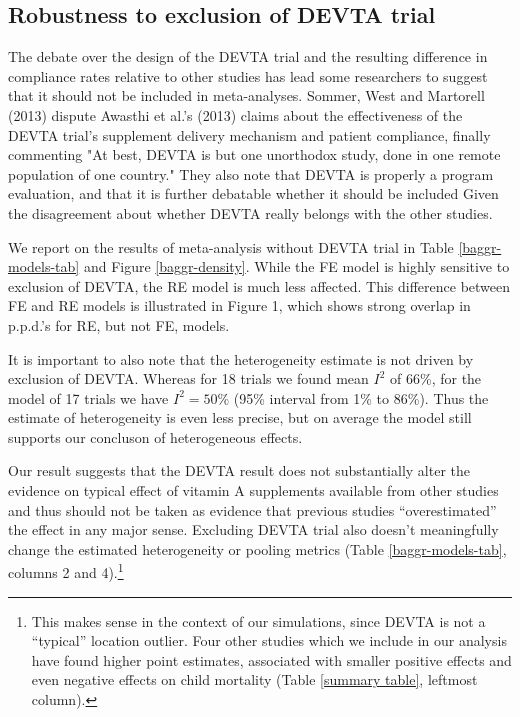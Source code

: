 \documentclass[12pt]{article}
\begin{document}
\subsection{Robustness to exclusion of DEVTA trial}

The debate over the design of the DEVTA trial and the resulting difference in compliance rates relative to other studies has lead some researchers to suggest that it should not be included in meta-analyses. Sommer, West and Martorell (2013) dispute Awasthi et al.'s (2013) claims about the effectiveness of the DEVTA trial's supplement delivery mechanism and patient compliance, finally commenting "At best, DEVTA is but one unorthodox study, done in one remote population of one country." 
They also note that DEVTA is properly a program evaluation, and that it is further debatable whether it should be included Given the disagreement about whether DEVTA really belongs with the other studies. 

We report on the results of meta-analysis without DEVTA trial in Table \ref{baggr-models-tab} and Figure \ref{baggr-density}. While the FE model is highly sensitive to exclusion of DEVTA, the RE model is much less affected. This difference between FE and RE models is illustrated in Figure 1, which shows strong overlap in p.p.d.'s for RE, but not FE, models.

It is important to also note that the heterogeneity estimate is not driven by exclusion of DEVTA. Whereas for 18 trials we found mean $I^2$ of 66\%, for the model of 17 trials we have $I^2 = 50\%$ (95\% interval from 1\% to 86\%). Thus the estimate of heterogeneity is even less precise, but on average the model still supports our concluson of heterogeneous effects.

Our result suggests that the DEVTA result does not substantially alter the evidence on typical effect of vitamin A supplements available from other studies and thus should not be taken as evidence that previous studies ``overestimated'' the effect in any major sense. Excluding DEVTA trial also doesn't meaningfully change the estimated heterogeneity or pooling metrics (Table \ref{baggr-models-tab}, columns 2 and 4).\footnote{This makes sense in the context of our simulations, since DEVTA is not a ``typical'' location outlier. Four other studies which we include in our analysis have found higher point estimates, associated with smaller positive effects and even negative effects on child mortality (Table \ref{summary table}, leftmost column).}
\end{document}
